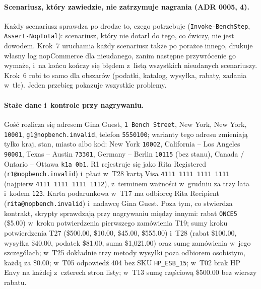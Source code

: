 \paragraph{Scenariusz, który zawiedzie, nie zatrzymuje nagrania (ADR 0005, 4).} Każdy
scenariusz sprawdza po drodze to, czego potrzebuje (\texttt{Invoke-BenchStep},
\texttt{Assert-NopTotal}): scenariusz, który nie dotarł do tego, co ćwiczy, nie jest
dowodem. Krok~7 uruchamia każdy scenariusz także po porażce innego, drukuje własny log
nopCommerce dla nieudanego, zanim następne przywrócenie go wymaże, i~na końcu kończy się
błędem z~listą wszystkich nieudanych scenariuszy. Krok~6 robi to samo dla obszarów
(podatki, katalog, wysyłka, rabaty, zadania w~tle). Jeden przebieg pokazuje wszystkie
problemy.

\paragraph{Stałe dane i~kontrole przy nagrywaniu.} Gość rozlicza się adresem Gina Guest,
\texttt{1 Bench Street}, New York, New York, \texttt{10001}, \texttt{g1@nopbench.invalid},
telefon \texttt{5550100}; warianty tego adresu zmieniają tylko kraj, stan, miasto albo kod:
New York \texttt{10002}, California -- Los Angeles \texttt{90001}, Texas -- Austin
\texttt{73301}, Germany -- Berlin \texttt{10115} (bez stanu), Canada / Ontario -- Ottawa
\texttt{k1a 0b1}. R1 rejestruje się jako Rita Registered (\texttt{r1@nopbench.invalid})
i~płaci w~T28 kartą Visa \texttt{4111 1111 1111 1111} (najpierw
\texttt{4111 1111 1111 1112}), z~terminem ważności w~grudniu za trzy lata i~kodem
\texttt{123}. Karta podarunkowa w~T17 ma odbiorcę Rita Recipient
(\texttt{rita@nopbench.invalid}) i~nadawcę Gina Guest. Poza
tym, co stwierdza kontrakt, skrypty sprawdzają przy nagrywaniu między innymi: rabat
\texttt{ONCE5} (\$5.00) w~kroku potwierdzenia pierwszego zamówienia T19; sumy kroku
potwierdzenia T27 (\$500.00, \$10.00, \$45.00, \$555.00) i~T28 (rabat \$100.00, wysyłka
\$40.00, podatek \$81.00, suma \$1,021.00) oraz sumę zamówienia w~jego szczegółach; w~T25
dokładnie trzy metody wysyłki poza odbiorem osobistym, każdą za \$0.00; w~T05 odpowiedź 404
bez SKU \texttt{HP\_ESB\_15}; w~T02 brak HP Envy na każdej z~czterech stron listy; w~T13 sumę
częściową \$500.00 bez wierszy rabatu.

